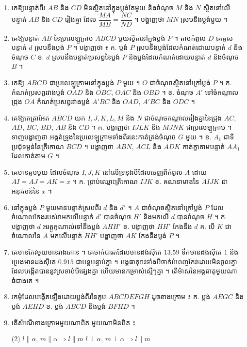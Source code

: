 \begin{enumerate}[1]
  \item គេឱ្យបន្ទាត់ពីរ $AB$ និង $CD$ មិនស្ថិតនៅក្នុងប្លង់តែមួយ និងចំណុច $M$ និង $N$ ស្ថិតនៅលើបន្ទាត់ $AB$ និង $CD$ រៀងគ្នា ដែល $\dfrac{MA}{MB} = \dfrac{NC}{ND}$ ។ បង្ហាញថា $MN$ ស្របនឹងប្លង់មួយ ។
  \item គេឱ្យបន្ទាត់ $AB$ នៃប្រលេឡូក្រាម $ABCD$ មួយស្ថិតនៅក្នុងប្លង់ $P$ ។ តាមកំពូល $D$ គេគូសបន្ទាត់ $d$ ស្របនឹងប្លង់ $P$ ។ បង្ហាញថា ៖ ក. ប្លង់ $P$ ស្របនឹងប្លង់ដែលកំណត់ដោយបន្ទាត់ $d$ និងចំណុច $C$ \quad ខ. $d$ ស្របនឹងបន្ទាត់ប្រសព្វនៃប្លង់ $P$ និងប្លង់ដែលកំណត់ដោយបន្ទាត់ $d$ និងចំណុច $B$ ។
  \item គេឱ្យ $ABCD$ ជាប្រលេឡូក្រាមនៅក្នុងប្លង់ $P$ មួយ ។ $O$ ជាចំណុចស្ថិតនៅក្រៅប្លង់ $P$ ។ \quad ក. កំណត់ប្រសព្វរវាងប្លង់ $OAD$ និង $OBC$, $OAC$ និង $OBD$ ។ \quad ខ. ចំណុច $A'$ ទៅចំកណ្ដាលជ្រុង $OA$ កំណត់ប្រសព្វរវាងប្លង់ $A'BC$ និង $OAD$, $A'BC$ និង $ODC$ ។
  \item គេឱ្យតេត្រាអែត $ABCD$ យក $I, J, K, L, M$ និង $N$ ជាចំណុចកណ្ដាលរៀងគ្នានៃជ្រុង $AC$, $AD$, $BC$, $BD$, $AB$ និង $CD$ ។ \quad ក. បង្ហាញថា $IJLK$ និង $MJNK$ ជាប្រលេឡូក្រាម ។ ទាញបង្ហាញថា អង្កត់ទ្រូងនៃប្រលេឡូក្រាមទាំងពីរនេះកាត់ត្រង់ចំណុច $G$ មួយ ។ \quad ខ. $A_1$ ជាទីប្រជុំទម្ងន់នៃត្រីកោណ $BCD$ ។ បង្ហាញថា $ABN$, $ACL$ និង $ADK$ កាត់គ្នាតាមបន្ទាត់ $AA_1$ ដែលកាត់តាម $G$ ។
  \item គេមានគូបមួយ ដែលចំណុច $I, J, K$ នៅលើទ្រនុងបីដែលចេញពីកំពូល $A$ ដោយ $AI = AJ = AK = x$ ។ \quad ក. ប្រាប់ឈ្មោះត្រីកោណ $IJK$ \quad ខ. គណនាមាឌនៃ $AIJK$ ជាអនុគមន៍នៃ $x$ ។
  \item នៅក្នុងប្លង់ $P$ មួយមានបន្ទាត់ស្របពីរ $d$ និង $d'$ ។ $A$ ជាចំណុចស្ថិតនៅក្រៅប្លង់ $P$ ដែលចំណោលកែងរបស់វាមកលើបន្ទាត់ $d'$ បានចំណុច $H'$ និងមកលើ $d$ បានចំណុច $H$ ។ \quad ក. បង្ហាញថា $d$ អរត្តូកូណាល់ទៅនឹងប្លង់ $AHH'$ \quad ខ. បង្ហាញថា $HH'$ កែងនឹង $d$ \quad គ. បើ $K$ ជាចំណោលនៃ $A$ មកលើបន្ទាត់ $HH'$ បង្ហាញថា $AK$ កែងនឹងប្លង់ $P$ ។
  \item គេមានកែវមួយមានរាងកោន ។ គេចាក់បារតដែលមានដង់ស៊ីតេ $13.59$ ទឹកមានដង់ស៊ីតេ $1$ និងប្រេងមានដង់ស៊ីតេ $0.915$ ជាបន្តបន្ទាប់គ្នា ។ អង្គធាតុរាវទាំងបីចាក់បំពេញកែវដោយមិនចូលគ្នា ដែលបង្កើតបាននូវស្រទាប់បីផ្សេងគ្នា ហើយមានកម្រាស់ស្មើៗគ្នា ។ តើម៉ាសនៃអង្គធាតុមួយណាធំជាងគេ ។
  \item រកមុំដែលបង្កើតឡើងដោយប្លង់ពីរនៃគូប $ABCDEFGH$ ដូចខាងក្រោម ៖ \quad ក. ប្លង់ $AEGC$ និងប្លង់ $AEHD$ \quad ខ. ប្លង់ $ABCD$ និងប្លង់ $BFHD$ ។
  \item តើសំណើខាងក្រោមមួយណាពិត មួយណាមិនពិត ៖
  \begin{tasks}(2)
    \task $l \parallel \alpha$, $m \parallel \alpha \Rightarrow l \parallel m$
    \task $l \perp \alpha$, $m \perp \alpha \Rightarrow l \parallel m$

\end{tasks}
\end{enumerate}
